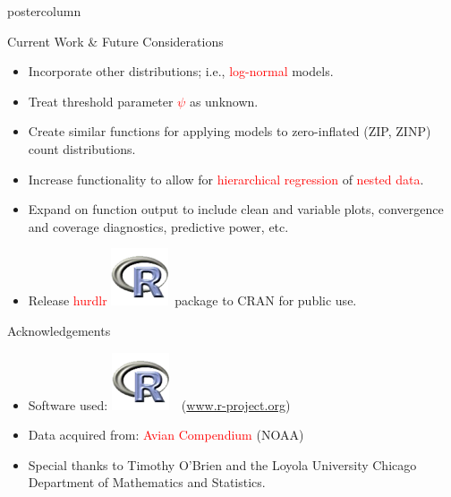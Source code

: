 \documentclass[final]{beamer}\usepackage[]{graphicx}\usepackage[]{color}
\newcommand{\red}{\textcolor{red}}
\begin{document}
{\begin{frame}
\begin{columns}
\begin{column}{.33\textwidth}
\begin{beamercolorbox}[center,wd=\textwidth]{postercolumn}
\begin{minipage}[T]{.97\textwidth}
{%
\begin{block}{Current Work \& Future Considerations}
\begin{itemize}
	\item Incorporate other distributions; i.e., \red{log-normal} models.
	\item Treat threshold parameter \red{$\psi$} as unknown.
	\item Create similar functions for applying models to zero-inflated (ZIP, ZINP) count distributions.
	\item Increase functionality to allow for \red{hierarchical regression} of \red{nested data}.
	\item Expand on function output to include clean and variable plots, convergence and coverage diagnostics, predictive power, etc.
	\item Release \red{hurdlr} \includegraphics[scale=.55]{miscPP.png}\ package to CRAN for public use.
\end{itemize}



\end{block}
\vfill
\begin{block}{Acknowledgements}


\begin{itemize}
\item Software used: \includegraphics[scale=.55]{miscPP.png}\ \ (\url{www.r-project.org}) 
\item Data acquired from: \red{Avian Compendium} (NOAA)
\item Special thanks to Timothy O'Brien and the Loyola University Chicago Department of Mathematics and Statistics.
\end{itemize}



\end{block}





}
\end{minipage}
\end{beamercolorbox}
\end{column}
\end{columns}
\end{frame}}
\end{document}
